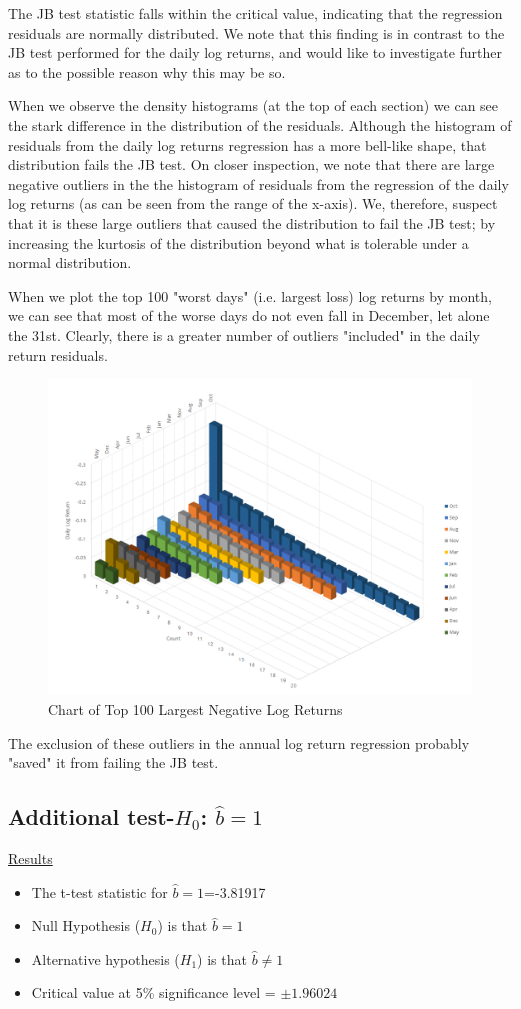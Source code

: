 \documentclass[a4paper]{article}
\begin{document}
	The JB test statistic falls within the critical value, indicating that the regression residuals are normally distributed. We note that this finding is in contrast to the JB test performed for the daily log returns, and would like to investigate further as to the possible reason why this may be so.
	
	When we observe the density histograms (at the top of each section) we can see the stark difference in the distribution of the residuals. Although the histogram of residuals from the daily log returns regression has a more bell-like shape, that distribution fails the JB test. On closer inspection, we note that there are large negative outliers in the the histogram of residuals from the regression of the daily log returns (as can be seen from the range of the x-axis). We, therefore, suspect that it is these large outliers that caused the distribution to fail the JB test; by increasing the kurtosis of the distribution beyond what is tolerable under a normal distribution.
	
	When we plot the top 100 "worst days" (i.e. largest loss) log returns by month, we can see that most of the worse days do not even fall in December, let alone the 31st. Clearly, there is a greater number of outliers "included" in the daily return residuals. 
	
	\begin{figure}[ht]
		\centering
		\includegraphics[width=0.6\linewidth, frame]{worstdays.png}
		\caption{Chart of Top 100 Largest Negative Log Returns}
	\end{figure}
	
	The exclusion of these outliers in the annual log return regression probably "saved" it from failing the JB test. 
	
	\subsection{Additional test-$H_0$: $\hat{b}=1$}
	\underline{Results}
	\begin{itemize}[nosep]
		\item The t-test statistic for $\hat{b}=1$=-3.81917
		\item Null Hypothesis ($H_0$) is that $\hat{b}=1$
		\item Alternative hypothesis ($H_1$) is that $\hat{b} \ne 1$
		\item Critical value at 5\% significance level = $\pm 1.96024$
	\end{itemize}
	
\end{document}
